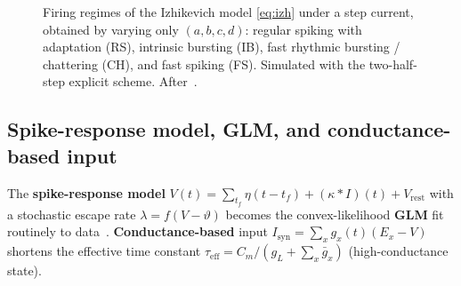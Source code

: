 \documentclass[11pt]{article}
\begin{document}
\begin{figure}[h]
\centering
{}
\caption{Firing regimes of the Izhikevich model \eqref{eq:izh} under a step current, obtained by
varying only $(a,b,c,d)$: regular spiking with adaptation (RS), intrinsic bursting (IB), fast
rhythmic bursting / chattering (CH), and fast spiking (FS). Simulated with the two-half-step
explicit scheme. After~\cite{izhikevich2003}.}
\label{fig:izh}
\end{figure}

\subsection{Spike-response model, GLM, and conductance-based input}\label{sec:srm}
The \textbf{spike-response model} $V(t)=\sum_{t_f}\eta(t-t_f)+(\kappa*I)(t)+V_{\mathrm{rest}}$ with a
stochastic escape rate $\lambda=f(V-\vartheta)$ becomes the convex-likelihood \textbf{GLM} fit
routinely to data~\cite{gerstner2014}. \textbf{Conductance-based} input
$I_{\mathrm{syn}}=\sum_xg_x(t)(E_x-V)$ shortens the effective time constant
$\tau_{\mathrm{eff}}=C_m/(g_L+\sum_x\bar g_x)$ (high-conductance state).

\end{document}
